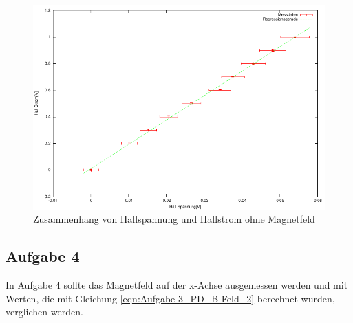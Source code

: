 \documentclass[12pt]{scrartcl}
\begin{document}
\begin{figure}[htbp] 
  \centering
    \includegraphics[scale = 1.3]{aufgabe_3_e_o.pdf}
  	\caption[Zusammenhang von Hallspannung und Hallstrom ohne Magnetfeld]{Zusammenhang von Hallspannung und Hallstrom ohne Magnetfeld}
  \label{fig:kasten}
\end{figure}

\newpage

\subsection{Aufgabe 4}
In Aufgabe 4 sollte das Magnetfeld auf der x-Achse ausgemessen werden und mit Werten, die mit Gleichung \ref{eqn:Aufgabe 3_PD_B-Feld_2} berechnet wurden, verglichen werden.
\end{document}
